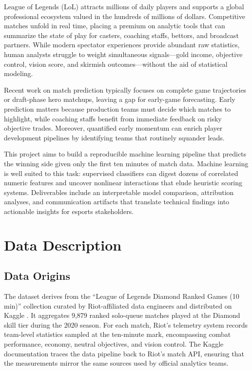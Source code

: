 \documentclass[aps,prl,preprint,groupedaddress]{revtex4-2}
\begin{document}
League of Legends (LoL) attracts millions of daily players and supports a global professional ecosystem valued in the hundreds of millions of dollars. Competitive matches unfold in real time, placing a premium on analytic tools that can summarize the state of play for casters, coaching staffs, bettors, and broadcast partners. While modern spectator experiences provide abundant raw statistics, human analysts struggle to weight simultaneous signals---gold income, objective control, vision score, and skirmish outcomes---without the aid of statistical modeling.

Recent work on match prediction typically focuses on complete game trajectories or draft-phase hero matchups, leaving a gap for early-game forecasting. Early prediction matters because production teams must decide which matches to highlight, while coaching staffs benefit from immediate feedback on risky objective trades. Moreover, quantified early momentum can enrich player development pipelines by identifying teams that routinely squander leads.

This project aims to build a reproducible machine learning pipeline that predicts the winning side given only the first ten minutes of match data. Machine learning is well suited to this task: supervised classifiers can digest dozens of correlated numeric features and uncover nonlinear interactions that elude heuristic scoring systems. Deliverables include an interpretable model comparison, attribution analyses, and communication artifacts that translate technical findings into actionable insights for esports stakeholders.

\section{Data Description}
\label{sec:data}

\subsection{Data Origins}
The dataset derives from the ``League of Legends Diamond Ranked Games (10 min)'' collection curated by Riot-affiliated data engineers and distributed on Kaggle \cite{bobby2020lol}. It aggregates 9,879 ranked solo-queue matches played at the Diamond skill tier during the 2020 season. For each match, Riot's telemetry system records team-level statistics sampled at the ten-minute mark, encompassing combat performance, economy, neutral objectives, and vision control. The Kaggle documentation traces the data pipeline back to Riot's match API, ensuring that the measurements mirror the same sources used by official analytics teams.
\end{document}
